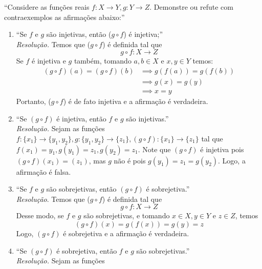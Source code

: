 \enquote{Considere as funções reais $f: X \rightarrow Y, g: Y \rightarrow Z$. Demonstre ou refute com contraexemplos as afirmações abaixo:}
    \begin{enumerate}
    \item \enquote{Se $f$ e $g$ são injetivas, então ($g \circ f$) é injetiva;} 
    \\ \emph{Resolução.} Temos que ($g \circ f$) é definida tal que
    \begin{displaymath}
        g \circ f: X \rightarrow Z 
    \end{displaymath}
    Se $f$ é injetiva e $g$ também, tomando $a, b \in X \text{ e } x, y \in Y$ temos:
    \begin{align*}
        (g \circ f)(a) = (g \circ f)(b) & \implies
        g(f(a)) = g(f(b)) \\ & \implies
        g(x) = g(y) \\ & \implies
        x = y
    \end{align*}
    Portanto, ($g \circ f$) é de fato injetiva e a afirmação é verdadeira.
    \item \enquote{Se $(g \circ f)$ é injetiva, então $f$ e $g$ são injetivas.} 
    \\ \emph{Resolução.} Sejam as funções $f: \{x_1\} \rightarrow \{y_1, y_2\}, g: \{y_1, y_2\} \rightarrow \{z_1\}, (g \circ f): \{x_1\} \rightarrow \{z_1\}$ tal que $f(x_1) = y_1, g(y_1) = z_1, g(y_2) = z_1$.
    Note que $(g \circ f)$ é injetiva pois $(g \circ f)(x_1) = (z_1)$, mas $g$ não é pois $g(y_1) = z_1 = g(y_2)$.
    Logo, a afirmação é falsa.
    \item \enquote{Se $f$ e $g$ são sobrejetivas, então $(g\circ f)$ é sobrejetiva.}
    \\ \emph{Resolução}. Temos que ($g \circ f$) é definida tal que
    \begin{displaymath}
        g \circ f: X \rightarrow Z 
    \end{displaymath}
    Desse modo, se $f$ e $g$ são sobrejetivas, e tomando $x \in X, y \in Y$ e $z \in Z$, temos
    \begin{displaymath}
        (g\circ f)(x) = g(f(x)) = g(y) = z
    \end{displaymath}
    Logo, $(g \circ f)$ é sobrejetiva e a afirmação é verdadeira.
    \item \enquote{Se $(g \circ f)$ é sobrejetiva, então $f \text{ e } g$ são sobrejetivas.}
    \\ \emph{Resolução.} Sejam as funções
    \begin{align*}

\end{align*}
\end{enumerate}
